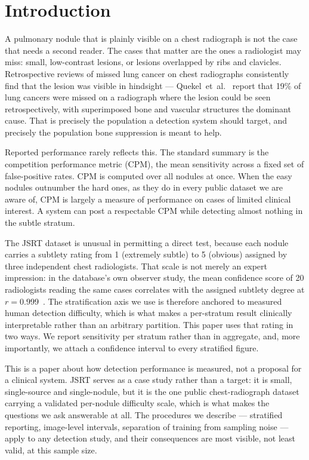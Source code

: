 \documentclass[11pt,a4paper]{article}
\begin{document}
\section{Introduction}

A pulmonary nodule that is plainly visible on a chest radiograph is not the
case that needs a second reader. The cases that matter are the ones a
radiologist may miss: small, low-contrast lesions, or lesions overlapped by
ribs and clavicles. Retrospective reviews of missed lung cancer on chest
radiographs consistently find that the lesion was visible in hindsight ---
Quekel~et~al.~\cite{quekel1999missrate} report that 19\% of lung cancers were
missed on a radiograph where the lesion could be seen retrospectively, with
superimposed bone and vascular structures the dominant cause. That is precisely
the population a detection system should target, and precisely the population
bone suppression is meant to help.

Reported performance rarely reflects this. The standard summary is the
competition performance metric (CPM), the mean sensitivity across a fixed set
of false-positive rates. CPM is computed over all nodules at once. When the
easy nodules outnumber the hard ones, as they do in every public dataset we are
aware of, CPM is largely a measure of performance on cases of limited clinical
interest. A system can post a respectable CPM while detecting almost nothing in
the subtle stratum.

The JSRT dataset is unusual in permitting a direct test, because each nodule
carries a subtlety rating from 1 (extremely subtle) to 5 (obvious) assigned by
three independent chest radiologists. That scale is not merely an expert
impression: in the database's own observer study, the mean confidence score of
20 radiologists reading the same cases correlates with the assigned subtlety
degree at $r = 0.999$~\cite{shiraishi2000jsrt}. The stratification axis we use
is therefore anchored to measured human detection difficulty, which is what
makes a per-stratum result clinically interpretable rather than an arbitrary
partition. This paper uses that rating in two ways. We report
sensitivity per stratum rather than in aggregate, and, more importantly, we
attach a confidence interval to every stratified figure.

This is a paper about how detection performance is measured, not a proposal
for a clinical system. JSRT serves as a case study rather than a target: it is
small, single-source and single-nodule, but it is the one public chest-radiograph
dataset carrying a validated per-nodule difficulty scale, which is what makes the
questions we ask answerable at all. The procedures we describe --- stratified
reporting, image-level intervals, separation of training from sampling noise ---
apply to any detection study, and their consequences are most visible, not least
valid, at this sample size.
\end{document}
